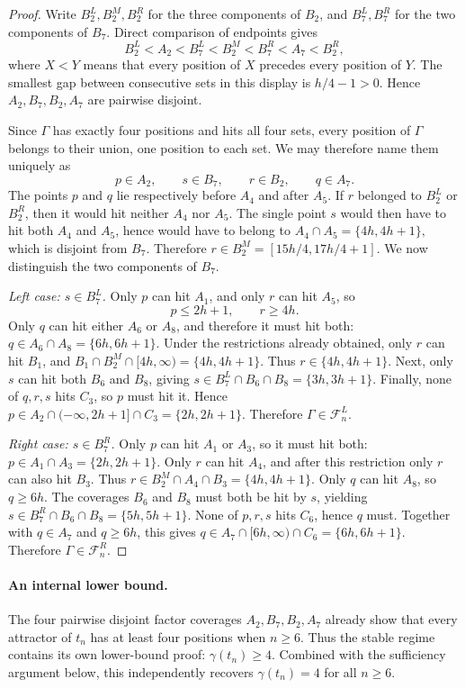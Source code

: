 \documentclass[11pt,a4paper]{article}
\theoremstyle{definition}\newtheorem{definition}[theorem]{Definition}
\theoremstyle{remark}\newtheorem{remark}[theorem]{Remark}
\newcommand{\FL}{\mathcal{F}^{L}}
\newcommand{\FR}{\mathcal{F}^{R}}
\begin{document}
\begin{proof}
Write $B_2^L,B_2^M,B_2^R$ for the three components of $B_2$, and $B_7^L,B_7^R$ for the two components of $B_7$.  Direct comparison of endpoints gives
\[
 B_2^L<A_2<B_7^L<B_2^M<B_7^R<A_7<B_2^R,
\]
where $X<Y$ means that every position of $X$ precedes every position of $Y$.  The smallest gap between consecutive sets in this display is $h/4-1>0$.  Hence $A_2,B_7,B_2,A_7$ are pairwise disjoint.

Since $\Gamma$ has exactly four positions and hits all four sets, every position of $\Gamma$ belongs to their union, one position to each set.  We may therefore name them uniquely as
\[
 p\in A_2,\qquad s\in B_7,\qquad r\in B_2,\qquad q\in A_7.
\]
The points $p$ and $q$ lie respectively before $A_4$ and after $A_5$.  If $r$ belonged to $B_2^L$ or $B_2^R$, then it would hit neither $A_4$ nor $A_5$.  The single point $s$ would then have to hit both $A_4$ and $A_5$, hence would have to belong to
$
 A_4\cap A_5=\{4h,4h+1\},
$
which is disjoint from $B_7$.  Therefore
$
 r\in B_2^M=[15h/4,17h/4+1].
$
We now distinguish the two components of $B_7$.

\smallskip
\noindent\emph{Left case: $s\in B_7^L$.}
Only $p$ can hit $A_1$, and only $r$ can hit $A_5$, so
\[
 p\le2h+1,\qquad r\ge4h.
\]
Only $q$ can hit either $A_6$ or $A_8$, and therefore it must hit both:
$
 q\in A_6\cap A_8=\{6h,6h+1\}.
$
Under the restrictions already obtained, only $r$ can hit $B_1$, and
$
 B_1\cap B_2^M\cap[4h,\infty)=\{4h,4h+1\}.
$
Thus $r\in\{4h,4h+1\}$.  Next, only $s$ can hit both $B_6$ and $B_8$, giving
$
 s\in B_7^L\cap B_6\cap B_8=\{3h,3h+1\}.
$
Finally, none of $q,r,s$ hits $C_3$, so $p$ must hit it.  Hence
$
 p\in A_2\cap(-\infty,2h+1]\cap C_3=\{2h,2h+1\}.
$
Therefore $\Gamma\in\FL_n$.

\smallskip
\noindent\emph{Right case: $s\in B_7^R$.}
Only $p$ can hit $A_1$ or $A_3$, so it must hit both:
$
 p\in A_1\cap A_3=\{2h,2h+1\}.
$
Only $r$ can hit $A_4$, and after this restriction only $r$ can also hit $B_3$.  Thus
$
 r\in B_2^M\cap A_4\cap B_3=\{4h,4h+1\}.
$
Only $q$ can hit $A_8$, so $q\ge6h$.  The coverages $B_6$ and $B_8$ must both be hit by $s$, yielding
$
 s\in B_7^R\cap B_6\cap B_8=\{5h,5h+1\}.
$
None of $p,r,s$ hits $C_6$, hence $q$ must.  Together with $q\in A_7$ and $q\ge6h$, this gives
$
 q\in A_7\cap[6h,\infty)\cap C_6=\{6h,6h+1\}.
$
Therefore $\Gamma\in\FR_n$.
\end{proof}

\paragraph{An internal lower bound.}
The four pairwise disjoint factor coverages $A_2,B_7,B_2,A_7$ already show that every attractor of $t_n$ has at least four positions when $n\ge6$.  Thus the stable regime contains its own lower-bound proof:
$
 \gamma(t_n)\ge4.
$
Combined with the sufficiency argument below, this independently recovers $\gamma(t_n)=4$ for all $n\ge6$.
\end{document}
